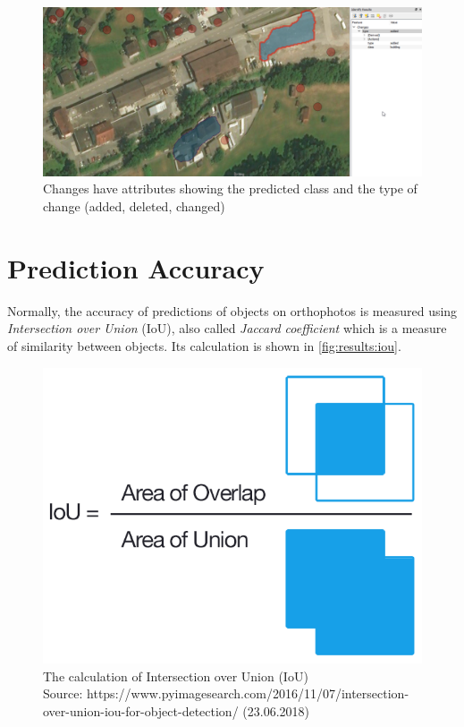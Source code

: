 \begin{figure}[H]
    \centering
	\includegraphics[width=1\linewidth]{chapters/practical_results/images/qgis_changes_attributes.png}
	\caption{Changes have attributes showing the predicted class and the type of change (added, deleted, changed)}
	\label{fig:plugin:change_attributes}
\end{figure}

\section{Prediction Accuracy}
Normally, the accuracy of predictions of objects on orthophotos is measured using \textit{Intersection over Union} (IoU), also called \textit{Jaccard coefficient} \cite{Liu.2011} which is a measure of similarity between objects. Its calculation is shown in \autoref{fig:results:iou}.

\begin{figure}[H]
    \centering
	\includegraphics[width=0.6\linewidth]{chapters/practical_results/images/iou_equation.png}
	\caption{The calculation of Intersection over Union (IoU)\\Source: https://www.pyimagesearch.com/2016/11/07/intersection-over-union-iou-for-object-detection/ (23.06.2018)}
	\label{fig:results:iou}
\end{figure}

